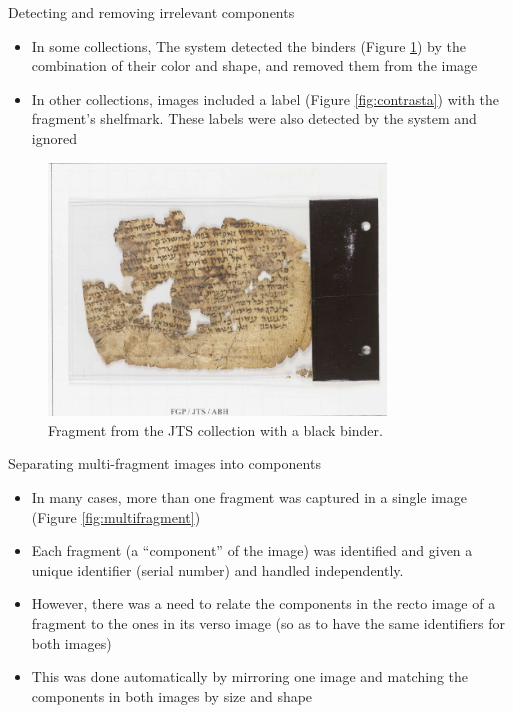 \documentclass[12pt]{beamer}
\begin{document}
\begin{frame}{Detecting and removing irrelevant components}
\begin{itemize}
\item In some collections, The system detected the binders (Figure \ref{fig:binder}) by the combination of their color and shape, and removed them from the image
\item In other collections, images included a label (Figure \ref{fig:contrasta})
with the fragment’s shelfmark. These labels were also detected by the
system and ignored
\end{itemize}
\end{frame}

\begin{frame}
\begin{figure}
\includegraphics[width=0.8\textwidth]{images/2.JPG}
\caption{Fragment from the JTS collection with a black binder.}\label{fig:binder}
\end{figure}
\end{frame}

\begin{frame}{Separating multi-fragment images into components}
\begin{itemize}
\item In many cases, more than one fragment was captured in a single image (Figure \ref{fig:multifragment})
\item Each fragment (a “component” of the image) was identified and given a unique identifier (serial number) and handled independently.
\item However, there was a need to relate the components in the recto image of a fragment to the ones in its verso image (so as to have the same identifiers for both images)
\item This was done automatically by mirroring one image and matching the components in both images by size and shape
\end{itemize}
\end{frame}
\end{document}

